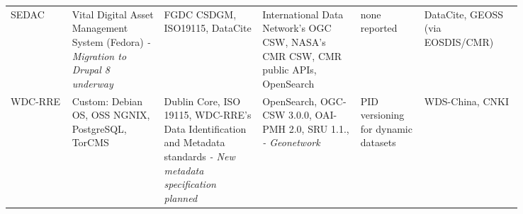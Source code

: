 \documentclass{interact}
\begin{document}
\begin{sidewaystable}
{\begin{tabular}{p{0.105\linewidth} p{0.15\linewidth} p{0.165\linewidth} p{0.16\linewidth} p{0.10\linewidth} p{0.16\linewidth} }
SEDAC & Vital Digital Asset Management System (Fedora) \newline \emph{- Migration to Drupal 8 underway} & FGDC CSDGM, ISO19115, DataCite & International Data Network's OGC CSW, NASA's CMR CSW, CMR public APIs, OpenSearch & none reported & DataCite, GEOSS (via EOSDIS/CMR)\\
WDC-RRE & Custom: Debian OS, OSS NGNIX, PostgreSQL, TorCMS & Dublin Core, ISO 19115, WDC-RRE’s Data Identification and Metadata standards \newline \emph{- New metadata specification planned} & OpenSearch, OGC-CSW 3.0.0, OAI-PMH 2.0, SRU 1.1., \newline \emph{- Geonetwork} & PID versioning for dynamic datasets & WDS-China, CNKI\\
\bottomrule
\end{tabular}}
\label{summary}
\end{sidewaystable}
\endgroup
\end{document}
